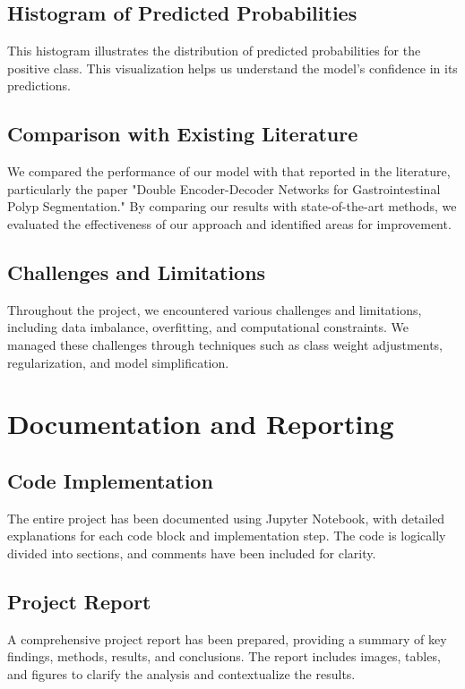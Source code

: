 \documentclass[12pt]{article}
\begin{document}
\subsection{Histogram of Predicted Probabilities}
This histogram illustrates the distribution of predicted probabilities for the positive class. This visualization helps us understand the model's confidence in its predictions.

\subsection{Comparison with Existing Literature}
We compared the performance of our model with that reported in the literature, particularly the paper "Double Encoder-Decoder Networks for Gastrointestinal Polyp Segmentation." By comparing our results with state-of-the-art methods, we evaluated the effectiveness of our approach and identified areas for improvement.

\subsection{Challenges and Limitations}
Throughout the project, we encountered various challenges and limitations, including data imbalance, overfitting, and computational constraints. We managed these challenges through techniques such as class weight adjustments, regularization, and model simplification.

\section{Documentation and Reporting}
\subsection{Code Implementation}
The entire project has been documented using Jupyter Notebook, with detailed explanations for each code block and implementation step. The code is logically divided into sections, and comments have been included for clarity.


\subsection{Project Report}
A comprehensive project report has been prepared, providing a summary of key findings, methods, results, and conclusions. The report includes images, tables, and figures to clarify the analysis and contextualize the results.
\end{document}
